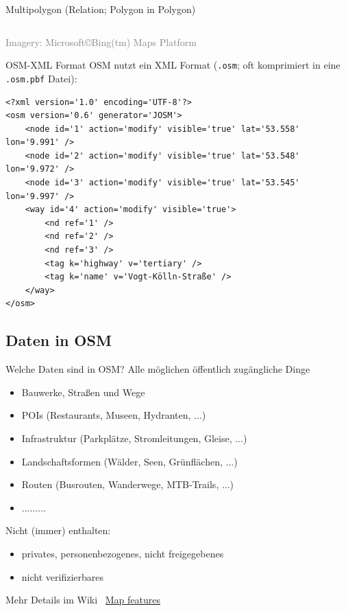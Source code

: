 \documentclass{beamer}
\begin{document}
\begin{frame}{Multipolygon (Relation; Polygon in Polygon)}
\begin{center}
\begin{columns}
\begin{column}{4cm}
						\end{column}
					\end{columns}
					\vspace{0.25cm}
					\textcolor{gray}{\tiny Imagery: Microsoft\copyright Bing(tm) Maps Platform}
				\end{center}
			\end{frame}
			
			\begin{frame}[fragile]{OSM-XML Format}
				OSM nutzt ein XML Format (\texttt{.osm}; oft komprimiert in eine \texttt{.osm.pbf} Datei):
				\vspace{0.25cm}
				{
					\scriptsize
					\begin{Verbatim}
<?xml version='1.0' encoding='UTF-8'?>
<osm version='0.6' generator='JOSM'>
    <node id='1' action='modify' visible='true' lat='53.558' lon='9.991' />
    <node id='2' action='modify' visible='true' lat='53.548' lon='9.972' />
    <node id='3' action='modify' visible='true' lat='53.545' lon='9.997' />
    <way id='4' action='modify' visible='true'>
        <nd ref='1' />
        <nd ref='2' />
        <nd ref='3' />
        <tag k='highway' v='tertiary' />
        <tag k='name' v='Vogt-Kölln-Straße' />
    </way>
</osm>
					\end{Verbatim}
				}
			\end{frame}
			
		\subsection{Daten in OSM}
			
			\begin{frame}{Welche Daten sind in OSM?}
				Alle möglichen öffentlich zugängliche Dinge
				\begin{itemize}
					\item Bauwerke, Straßen und Wege
					\item POIs (Restaurants, Museen, Hydranten, ...)
					\item Infrastruktur (Parkplätze, Stromleitungen, Gleise, ...)
					\item Landschaftsformen (Wälder, Seen, Grünflächen, ...)
					\item Routen (Busrouten, Wanderwege, MTB-Trails, ...)
					\item .........
				\end{itemize}
				\pause
				Nicht (immer) enthalten:
				\begin{itemize}
					\item privates, personenbezogenes, nicht freigegebenes
					\item nicht verifizierbares
				\end{itemize}
				\pause
				Mehr Details im Wiki \textrightarrow\ \href{https://wiki.openstreetmap.org/wiki/Map\_features}{Map features}
			\end{frame}
			
\end{document}

